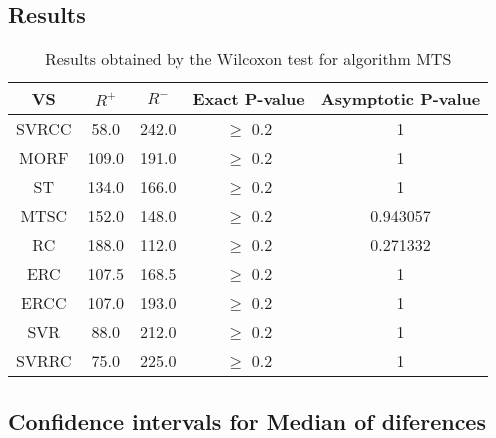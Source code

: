 \documentclass[a4paper,10pt]{article}
\begin{document}
\subsection{Results}

\begin{table}[!htp]
\centering\small
\begin{tabular}{
|c|c|c|c|c|}
\hline
 VS & $R^{+}$ & $R^{-}$ & Exact P-value & Asymptotic P-value \\ \hline 
SVRCC & 58.0 & 242.0 & $\geq$ 0.2 & 1\\ \hline 
MORF & 109.0 & 191.0 & $\geq$ 0.2 & 1\\ \hline 
ST & 134.0 & 166.0 & $\geq$ 0.2 & 1\\ \hline 
MTSC & 152.0 & 148.0 & $\geq$ 0.2 & 0.943057\\ \hline 
RC & 188.0 & 112.0 & $\geq$ 0.2 & 0.271332\\ \hline 
ERC & 107.5 & 168.5 & $\geq$ 0.2 & 1\\ \hline 
ERCC & 107.0 & 193.0 & $\geq$ 0.2 & 1\\ \hline 
SVR & 88.0 & 212.0 & $\geq$ 0.2 & 1\\ \hline 
SVRRC & 75.0 & 225.0 & $\geq$ 0.2 & 1\\ \hline 

\end{tabular}
\caption{Results obtained by the Wilcoxon test for algorithm MTS}
\end{table}

\subsection{Confidence intervals for Median of diferences}
\end{document}
